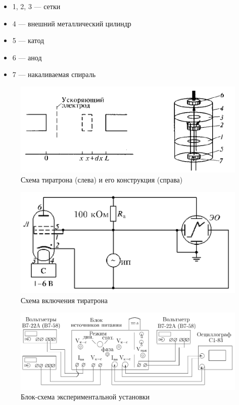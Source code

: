 \documentclass[a4paper, 12pt]{article}
\begin{document}
\begin{itemize}
    \item 1, 2, 3 --- сетки
    \item 4 --- внешний металлический цилиндр
    \item 5 --- катод
    \item 6 --- анод
    \item 7 --- накаливаемая спираль
\end{itemize}

\begin{figure}[!h]
    \includegraphics[scale = 0.4]{Workplace1}
    \centering
    \caption{Схема тиратрона (слева) и его конструкция (справа)}
    \label{pic:work1}
\end{figure}
\begin{figure}[!h]
    \includegraphics[scale = 0.4]{Workplace2}
    \centering
    \caption{Схема включения тиратрона}
    \label{pic:work2}
\end{figure}

\begin{figure}[!h]
    \includegraphics[scale = 0.4]{Workplace3}
    \centering
    \caption{Блок-схема экспериментальной установки}
    \label{pic:work3}
\end{figure}
\end{document}
